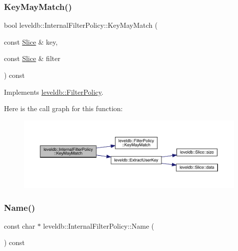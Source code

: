 \subsubsection{\texorpdfstring{KeyMayMatch()}{KeyMayMatch()}}
{\footnotesize\ttfamily bool leveldb\+::\+Internal\+Filter\+Policy\+::\+Key\+May\+Match (\begin{DoxyParamCaption}\item[{const \mbox{\hyperlink{classleveldb_1_1_slice}{Slice}} \&}]{key,  }\item[{const \mbox{\hyperlink{classleveldb_1_1_slice}{Slice}} \&}]{filter }\end{DoxyParamCaption}) const\hspace{0.3cm}{\ttfamily [virtual]}}



Implements \mbox{\hyperlink{classleveldb_1_1_filter_policy_a6f8ba10ea25e0b4b8d0a6607c361c718}{leveldb\+::\+Filter\+Policy}}.

Here is the call graph for this function\+:
\nopagebreak
\begin{figure}[H]
\begin{center}
\leavevmode
\includegraphics[width=350pt]{classleveldb_1_1_internal_filter_policy_aba61cb2c01f6c1d34128f115903ff559_cgraph}
\end{center}
\end{figure}
\mbox{\label{classleveldb_1_1_internal_filter_policy_aea56a32a2be2ad99f41c2009af823b44}} 
\subsubsection{\texorpdfstring{Name()}{Name()}}
{\footnotesize\ttfamily const char $\ast$ leveldb\+::\+Internal\+Filter\+Policy\+::\+Name (\begin{DoxyParamCaption}{ }\end{DoxyParamCaption}) const\hspace{0.3cm}{\ttfamily [virtual]}}



